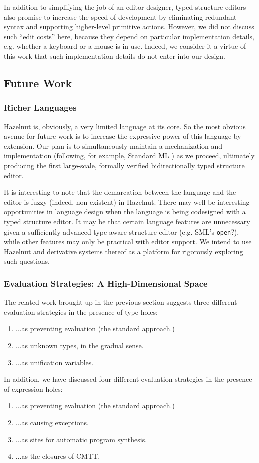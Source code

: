 \documentclass[9pt]{sigplanconf}
\begin{document}
In addition to simplifying the job of an editor designer, typed structure
editors also promise to increase the speed of development by eliminating
redundant syntax and supporting higher-level primitive actions. However, we
did not discuss such ``edit costs'' here, because they depend on particular
implementation details, e.g. whether a keyboard or a mouse is in
use. Indeed, we consider it a virtue of this work that such implementation
details do not enter into our design.

\subsection{Future Work}
\subsubsection{Richer Languages}
Hazelnut is, obviously, a very limited language at its core. So the most
obvious avenue for future work is to increase the expressive power of this
language by extension. Our plan is to simultaneously maintain a
mechanization and implementation (following, for example, Standard ML \cite{Lee:2007:TMM:1190216.1190245}) as
we proceed, ultimately producing the first large-scale, formally verified
bidirectionally typed structure editor.

It is interesting to note that the demarcation between the language and the
editor is fuzzy (indeed, non-existent) in Hazelnut. There may well be
interesting opportunities in language design when the language is being
codesigned with a typed structure editor. It may be that certain language
features are unnecessary given a sufficiently advanced type-aware structure
editor (e.g. SML's \texttt{open}?), while other features may only be
practical with editor support. We intend to use Hazelnut and derivative
systems thereof as a platform for rigorously exploring such questions.

\subsubsection{Evaluation Strategies: A High-Dimensional Space}
The related work brought up in the previous section suggests three different evaluation strategies in
the presence of type holes:
\begin{enumerate}[noitemsep]
\item ...as preventing evaluation (the standard approach.)
\item ...as unknown types, in the gradual sense.
\item ...as unification variables.
\end{enumerate}
In addition, we have discussed four different evaluation strategies in the
presence of expression holes:
\begin{enumerate}[noitemsep]
\item ...as preventing evaluation (the standard approach.)
\item ...as causing exceptions.
\item ...as sites for automatic program synthesis.
\item ...as the closures of CMTT.
\end{enumerate}
\end{document}
